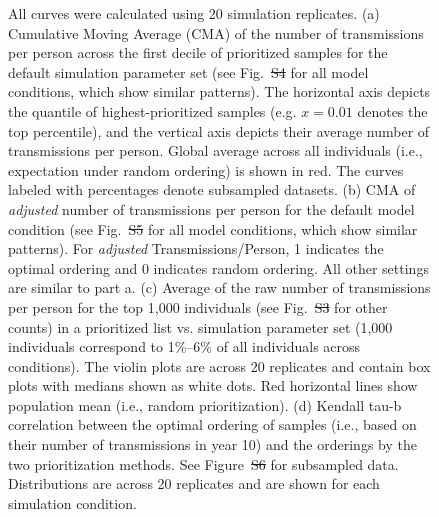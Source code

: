 \documentclass[a4paper,11pt]{article}
\newcommand{\PLWH}{sample\xspace}
\providecommand{\DIFadd}[1]{{\protect\color{blue}\uwave{#1}}} %
\providecommand{\DIFdel}[1]{{\protect\color{red}\sout{#1}}}                      %
\providecommand{\DIFaddFL}[1]{\DIFadd{#1}} %
\providecommand{\DIFdelFL}[1]{\DIFdel{#1}} %
\providecommand{\DIFaddbeginFL}{} %
\providecommand{\DIFaddendFL}{} %
\providecommand{\DIFdelbeginFL}{} %
\providecommand{\DIFdelendFL}{} %
\begin{document}
\begin{figure}[!tp]
{All curves were calculated using 20 simulation replicates.
(a) Cumulative Moving Average (CMA) of the number of transmissions per person across the first decile of prioritized \PLWH{s} for the default simulation parameter set (see Fig.~\DIFdelbeginFL \DIFdelFL{S4 }\DIFdelendFL \DIFaddbeginFL \DIFaddFL{S8 }\DIFaddendFL for all model conditions, which show similar patterns).
The horizontal axis depicts the quantile of highest-prioritized \PLWH{s} (e.g. $x=0.01$ denotes the top percentile), and the vertical axis depicts their average number of transmissions per person.
Global average across all individuals (i.e., expectation under random ordering) is shown in red.
The curves labeled with percentages denote subsampled datasets.
(b) CMA of \textit{adjusted} number of transmissions per person for the default model condition (see Fig.~\DIFdelbeginFL \DIFdelFL{S5 }\DIFdelendFL \DIFaddbeginFL \DIFaddFL{S9 }\DIFaddendFL for all model conditions, which show similar patterns). 
For \textit{adjusted} Transmissions/Person, 1 indicates the optimal ordering and 0 indicates  random ordering.
All other settings are similar to part a. 
(c) Average of the raw number of transmissions per person for the top 1,000 individuals (see Fig.~\DIFdelbeginFL \DIFdelFL{S3 }\DIFdelendFL \DIFaddbeginFL \DIFaddFL{S5 }\DIFaddendFL for other counts) in a prioritized list vs. simulation parameter set (1,000 individuals correspond to 1\%--6\% of all individuals across conditions). The violin plots are across 20 replicates and contain box plots with medians shown as white dots.
Red horizontal lines show population mean (i.e., random prioritization).
(d) Kendall tau-b correlation between the optimal ordering of \PLWH{s} (i.e., based on their number of transmissions in year 10) and the orderings by the two prioritization methods.
See Figure~\DIFdelbeginFL \DIFdelFL{S6 }\DIFdelendFL \DIFaddbeginFL \DIFaddFL{S7 }\DIFaddendFL for subsampled data. 
Distributions are across 20 replicates and are shown for each simulation condition. 
}\label{fig:efficacy-main}
\end{figure}











\end{document}
